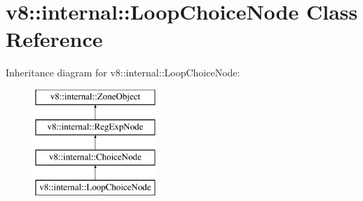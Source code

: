 \hypertarget{classv8_1_1internal_1_1LoopChoiceNode}{}\section{v8\+:\+:internal\+:\+:Loop\+Choice\+Node Class Reference}
\label{classv8_1_1internal_1_1LoopChoiceNode}
Inheritance diagram for v8\+:\+:internal\+:\+:Loop\+Choice\+Node\+:\begin{figure}[H]
\begin{center}
\leavevmode
\includegraphics[height=4.000000cm]{classv8_1_1internal_1_1LoopChoiceNode}
\end{center}
\end{figure}
